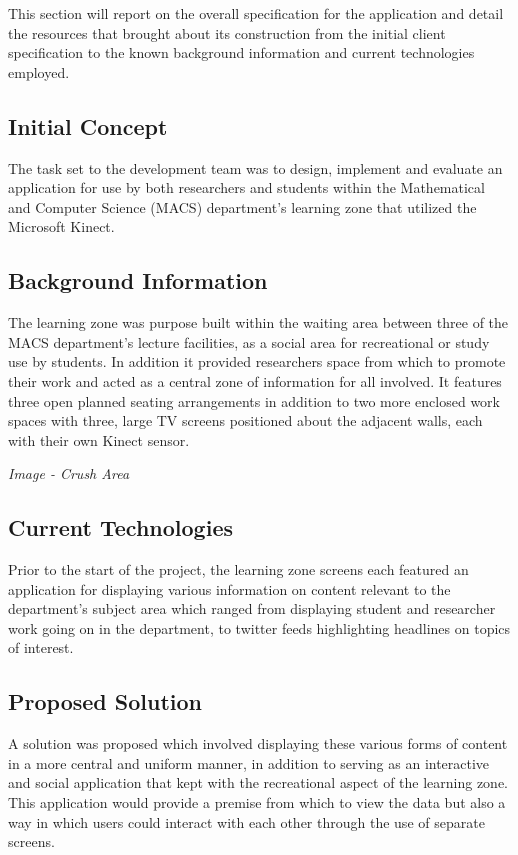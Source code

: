 This section will report on the overall specification for the application and detail the resources that brought about its construction from the initial client specification to the known background information and current technologies employed. 

\subsection{Initial Concept}
The task set to the development team was to design, implement and evaluate an application for use by both researchers and students within the Mathematical and Computer Science (MACS) department's learning zone that utilized the Microsoft Kinect.

\subsection{Background Information}
The learning zone was purpose built within the waiting area between three of the MACS department's lecture facilities, as a social area for recreational or study use by students. In addition it provided researchers space from which to promote their work and acted as a central zone of information for all involved. It features three open planned seating arrangements in addition to two more enclosed work spaces with three, large TV screens positioned about the adjacent walls, each with their own Kinect sensor. 

\begin{center}
\textit{Image - Crush Area}
\end{center}

\subsection{Current Technologies}
Prior to the start of the project, the learning zone screens each featured an application for displaying various information on content relevant to the department's subject area which ranged from displaying student and researcher work going on in the department, to twitter feeds highlighting headlines on topics of interest.

\subsection{Proposed Solution} 
A solution was proposed which involved displaying these various forms of content in a more central and uniform manner, in addition to serving as an interactive and social application that kept with the recreational aspect of the learning zone. This application would provide a premise from which to view the data but also a way in which users could interact with each other through the use of separate screens.
